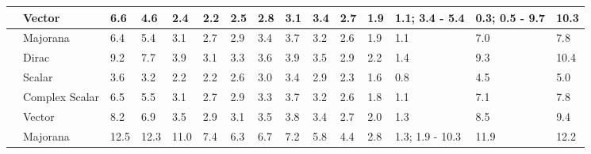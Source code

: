 \documentclass[notitlepage,letterpaper,natbib,aps,prd,onecolumn,amsmath,amsfonts,nofootinbib,preprintnumbers,superscriptaddress,secnumarabic,groupedaddress]{revtex4-1}
\begin{document}
\begin{table}[h]
{\begin{tabular}{c|l|p{0.7cm}|p{0.7cm}|p{0.7cm}|p{0.7cm}|p{0.7cm}|p{0.7cm}|p{0.7cm}|p{0.7cm}|p{0.7cm}|p{0.7cm}|p{2.08cm}|p{2.08cm}|p{0.7cm}}
                          & Vector         & \hfil  6.6          & \hfil    4.6       & \hfil 2.4          & \hfil 2.2          & \hfil     2.5       & \hfil 2.8           & \hfil 3.1      & \hfil    3.4       & \hfil  2.7          &  \hfil    1.9       & \hfil 1.1; 3.4 - 5.4          & \hfil 0.3; 0.5 - 9.7          & \hfil   10.3        \\
                        \hline
\parbox[t]{5mm}{} & Majorana      &    \hfil 6.4        &    \hfil 5.4        & \hfil 3.1           &  \hfil 2.7          &     \hfil 2.9       &  \hfil   3.4        &  \hfil 3.7     &\hfil  3.2           & \hfil 2.6           &    \hfil  1.9       &\hfil     1.1        &\hfil   7.0          &  \hfil 7.8                      \\
                          & Dirac        & \hfil 9.2           &  \hfil 7.7          &  \hfil 3.9          &  \hfil 3.1          &  \hfil 3.3          &  \hfil 3.6          & \hfil 3.9      & \hfil 3.5           &  \hfil 2.9          &  \hfil 2.2          &  \hfil 1.4          & \hfil 9.3           &  \hfil 10.4          \\
                          & Scalar       & \hfil 3.6           & \hfil 3.2           & \hfil 2.2           & \hfil 2.2            & \hfil 2.6           & \hfil 3.0           & \hfil 3.4      & \hfil 2.9           & \hfil 2.3           & \hfil 1.6           & \hfil 0.8           & \hfil 4.5           & \hfil 5.0           \\
                          & Complex Scalar & \hfil 6.5           & \hfil 5.5           & \hfil 3.1           & \hfil 2.7           & \hfil 2.9           & \hfil 3.3           & \hfil 3.7      & \hfil 3.2           & \hfil 2.6           & \hfil 1.8           & \hfil 1.1           & \hfil 7.1           & \hfil 7.8           \\
                          & Vector       &  \hfil 8.2          &  \hfil 6.9          &  \hfil 3.5          & \hfil 2.9           & \hfil 3.1           & \hfil 3.5           & \hfil 3.8      &  \hfil 3.4          &  \hfil 2.7          &  \hfil 2.0          &  \hfil 1.3          &  \hfil 8.5          &  \hfil 9.4            \\ \hline
\parbox[t]{5mm}{}     & Majorana     & \hfil 12.5  & \hfil 12.3 & \hfil 11.0 & \hfil 7.4 & \hfil 6.3 & \hfil 6.7 & \hfil 7.2 & \hfil 5.8 & \hfil 4.4 & \hfil 2.8 & \hfil 1.3; 1.9 - 10.3 & \hfil 11.9 & \hfil 12.2 \\

\end{tabular}}
\end{table}
\end{document}
